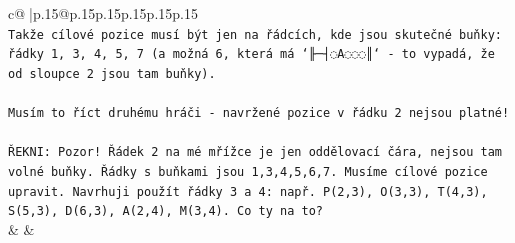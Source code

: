 \documentclass{article}
\begin{document}
{\begin{supertabular}{c@{$\;$}|p{.15\linewidth}@{}p{.15\linewidth}p{.15\linewidth}p{.15\linewidth}p{.15\linewidth}p{.15\linewidth}}
{{{\\ 
\texttt{Takže cílové pozice musí být jen na řádcích, kde jsou skutečné buňky: řádky 1, 3, 4, 5, 7 (a možná 6, která má `╟─┤◌A◌◌◌║` {-} to vypadá, že od sloupce 2 jsou tam buňky).} \\
\\ 
\texttt{Musím to říct druhému hráči {-} navržené pozice v řádku 2 nejsou platné!} \\
\\ 
\texttt{ŘEKNI: Pozor! Řádek 2 na mé mřížce je jen oddělovací čára, nejsou tam volné buňky. Řádky s buňkami jsou 1,3,4,5,6,7. Musíme cílové pozice upravit. Navrhuji použít řádky 3 a 4: např. P(2,3), O(3,3), T(4,3), S(5,3), D(6,3), A(2,4), M(3,4). Co ty na to?} \\
            }
        }
    }
    & & \\ \\


\end{supertabular}}
\end{document}
